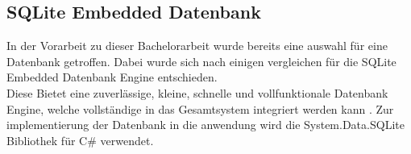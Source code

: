 \subsection{SQLite Embedded Datenbank}
In der Vorarbeit zu dieser Bachelorarbeit wurde bereits eine auswahl für eine Datenbank getroffen. Dabei wurde sich nach einigen vergleichen für die SQLite Embedded Datenbank Engine entschieden. \\
Diese Bietet eine zuverlässige, kleine, schnelle und vollfunktionale Datenbank Engine, welche vollständige in das Gesamtsystem integriert werden kann \cite{SQLiteHompage}. Zur implementierung der Datenbank in die anwendung wird die System.Data.SQLite Bibliothek für C\# verwendet.\\